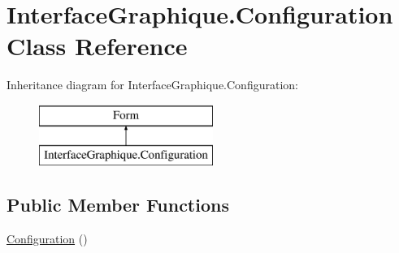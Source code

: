 \hypertarget{class_interface_graphique_1_1_configuration}{}\section{Interface\+Graphique.\+Configuration Class Reference}
\label{class_interface_graphique_1_1_configuration}
Inheritance diagram for Interface\+Graphique.\+Configuration\+:\begin{figure}[H]
\begin{center}
\leavevmode
\includegraphics[height=2.000000cm]{class_interface_graphique_1_1_configuration}
\end{center}
\end{figure}
\subsection*{Public Member Functions}
\begin{DoxyCompactItemize}
\item 
\hyperlink{group__inf2990_gadb0bf51b9f3e30cfed923c7d9d950493}{Configuration} ()
\end{DoxyCompactItemize}

